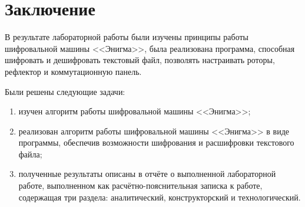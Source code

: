 \chapter*{Заключение}

В результате лабораторной работы были изучены принципы работы шифровальной машины <<Энигма>>, была реализована программа, способная шифровать и дешифровать текстовый файл, позволять настраивать роторы, рефлектор и коммутационную панель. 

Были решены следующие задачи:

\begin{enumerate}[label=\arabic*)]
	\item изучен алгоритм работы шифровальной машины <<Энигма>>;
    \item реализован алгоритм работы шифровальной машины <<Энигма>> в виде программы, обеспечив возможности шифрования и расшифровки текстового файла;
	\item полученные результаты описаны в отчёте о выполненной лабораторной работе, выполненном как расчётно-пояснительная записка к работе, содержащая три раздела: аналитический, конструкторский и технологический.
\end{enumerate}